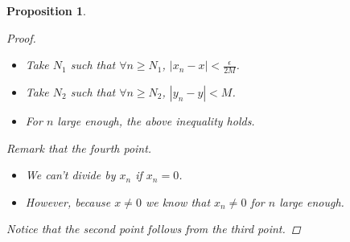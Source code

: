 \documentclass[10pt]{article}
\newtheorem{proposition}[theorem]{Proposition}
\theoremstyle{definition}
\theoremstyle{remark}
\begin{document}
\begin{proposition}
\begin{proof}
        \begin{itemize}
            \item Take $N_1$ such that $\forall n \geq N_1$, $|x_n - x| < \frac{\epsilon}{2M}$.
            \item Take $N_2$ such that $\forall n \geq N_2$, $|y_n - y| < M$.
            \item For $n$ large enough, the above inequality holds.
        \end{itemize}
        Remark that the fourth point.
        \begin{itemize}
            \item We can't divide by $x_n$ if $x_n = 0$.
            \item However, because $x \neq 0$ we know that $x_n \neq 0$ for $n$ large enough.
        \end{itemize}
        Notice that the second point follows from the third point.
    \end{proof}
\end{proposition}
\end{document}
